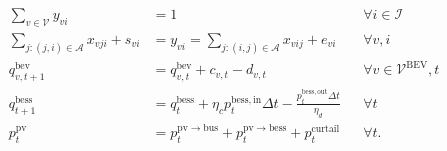 \begin{align}
  \sum_{v\in\mathcal V} y_{vi} &= 1 && \forall i\in\mathcal I \tag{EQ-COVER-S1-02}\\
  \sum_{j:(j,i)\in\mathcal A}x_{vji}+s_{vi} &= y_{vi}
  = \sum_{j:(i,j)\in\mathcal A}x_{vij}+e_{vi}
  && \forall v,i \tag{EQ-FLOW-S1-03}\\
  q^{\mathrm{bev}}_{v,t+1} &= q^{\mathrm{bev}}_{v,t}+c_{v,t}-d_{v,t}
  && \forall v\in\mathcal V^{\mathrm{BEV}},t \tag{EQ-SOC-BEV-09}\\
  q^{\mathrm{bess}}_{t+1} &= q^{\mathrm{bess}}_{t}
  +\eta_c p^{\mathrm{bess,in}}_t\Delta t
  -\frac{p^{\mathrm{bess,out}}_t\Delta t}{\eta_d}
  && \forall t \tag{EQ-BESS-SOC-15}\\
  p^{\mathrm{pv}}_t &= p^{\mathrm{pv\to bus}}_t
  +p^{\mathrm{pv\to bess}}_t+p^{\mathrm{curtail}}_t
  && \forall t \tag{EQ-PV-BAL-16}.
\end{align}
